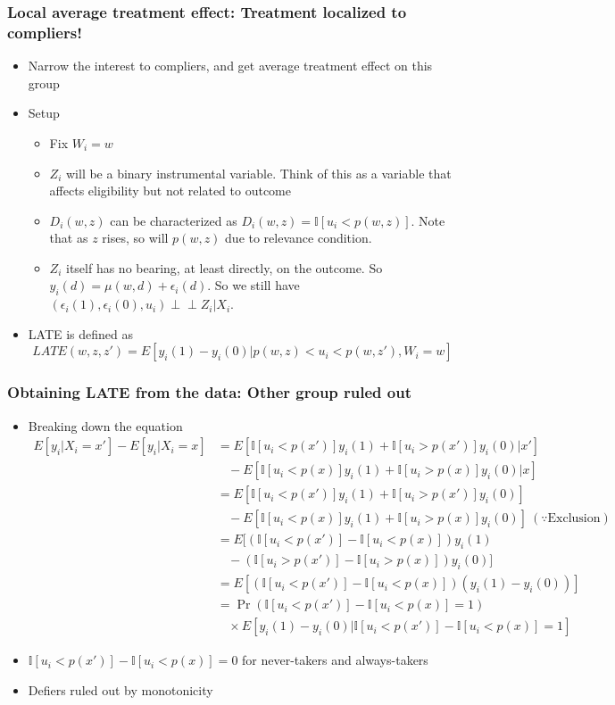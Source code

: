 \documentclass[aspectratio=169]{beamer}
\begin{document}
\begin{frame}
\frametitle{Local average treatment effect: Treatment localized to compliers!}
\begin{itemize}
\item Narrow the interest to compliers, and get average treatment effect on this group
\item Setup
\begin{itemize}
\item Fix $W_i=w$
\item $Z_i$ will be a binary instrumental variable. Think of this as a variable that affects eligibility but not related to outcome 
\item $D_i(w, z)$ can be characterized as $D_i(w, z)=\mathbb{I}[u_i<p(w,z)]$. Note that as $z$ rises, so will $p(w,z)$ due to relevance condition. 
\item $Z_i$ itself has no bearing, at least directly, on the outcome. So $y_i(d)=\mu(w,d)+\epsilon_i(d)$. So we still have $(\epsilon_i(1), \epsilon_i(0), u_i)\perp\!\!\!\perp Z_i|X_i$. 
\end{itemize} 
\item LATE is defined as
\[
LATE(w,z,z')=E[y_i(1)-y_i(0)|p(w,z)<u_i<p(w,z'), W_i=w]
\]
\end{itemize}
\end{frame}

\begin{frame}
\frametitle{Obtaining LATE from the data: Other group ruled out}
\begin{itemize}
\item Breaking down the equation
\footnotesize{\[
\begin{aligned}
E[y_i|X_i=x']-E[y_i|X_i=x]&=E[\mathbb{I}[u_i<p(x')]y_i(1)+\mathbb{I}[u_i>p(x')]y_i(0)|x']\\
&\ \ \ \ -E[\mathbb{I}[u_i<p(x)]y_i(1)+\mathbb{I}[u_i>p(x)]y_i(0)|x]\\ 
&=E[\mathbb{I}[u_i<p(x')]y_i(1)+\mathbb{I}[u_i>p(x')]y_i(0)]\\
&\ \ \ \ -E[\mathbb{I}[u_i<p(x)]y_i(1)+\mathbb{I}[u_i>p(x)]y_i(0)]\ (\because\text{Exclusion})\\
&=E[(\mathbb{I}[u_i<p(x')]-\mathbb{I}[u_i<p(x)])y_i(1)\\
&\ \ \ \ -(\mathbb{I}[u_i>p(x')]-\mathbb{I}[u_i>p(x)])y_i(0)]\\
&=E[(\mathbb{I}[u_i<p(x')]-\mathbb{I}[u_i<p(x)])(y_i(1)-y_i(0))]\\
&=\Pr(\mathbb{I}[u_i<p(x')]-\mathbb{I}[u_i<p(x)]=1)\\
&\ \ \ \ \times E[y_i(1)-y_i(0)|\mathbb{I}[u_i<p(x')]-\mathbb{I}[u_i<p(x)]=1]
\end{aligned}
\]}\normalsize
\item $\mathbb{I}[u_i<p(x')]-\mathbb{I}[u_i<p(x)]=0$ for never-takers and always-takers
\item Defiers ruled out by monotonicity
\end{itemize}
\end{frame}
\end{document}
